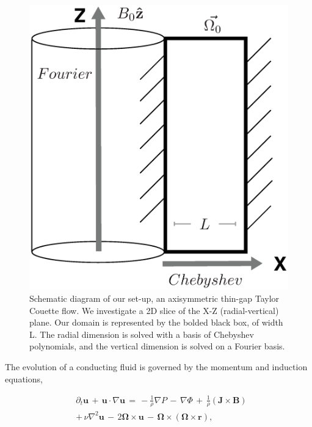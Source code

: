 \documentclass{emulateapj}
\newcommand{\beq}{\begin{equation}}
\newcommand{\eeq}{\end{equation}}
\begin{document}
\begin{figure}[h!]
\centering
\includegraphics[trim=5cm 0cm 0cm 0cm, scale=.35]{setup_diagram.eps}
\caption{Schematic diagram of our set-up, an axisymmetric thin-gap Taylor Couette flow. We investigate a 2D slice of the X-Z (radial-vertical) plane. Our domain is represented by the bolded black box, of width L. The radial dimension is solved with a basis of Chebyshev polynomials, and the vertical dimension is solved on a Fourier basis. }\label{fig:setup}
\end{figure}

The evolution of a conducting fluid is governed by the momentum and induction equations,

\beq\label{eq:momentum}
\begin{split}
& \partial_t \mathbf{u} \, + \, \mathbf{u} \cdot \nabla \mathbf{u} \, = \, -\frac{1}{\rho}\nabla P \, - \, \nabla\Phi \, + \, \frac{1}{\rho} \left(\mathbf{J}\times\mathbf{B}\right) \, \\
& + \, \nu\nabla^2 \mathbf{u} \, - \, 2\mathbf{\Omega} \times \mathbf{u} \, - \, \mathbf{\Omega} \times \left(\mathbf{\Omega} \times \mathbf{r} \right), \\
\end{split}
\eeq
\end{document}
